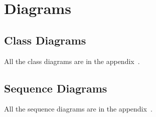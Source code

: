 \chapter{Diagrams}\label{ch:diagrams}

\section{Class Diagrams}
All the class diagrams are in the appendix~.

\section{Sequence Diagrams}
All the sequence diagrams are in the appendix~.

